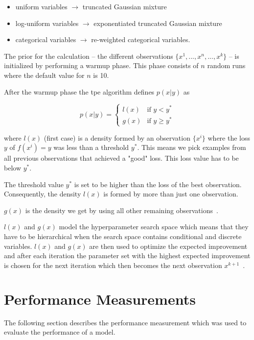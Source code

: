 \begin{itemize}
	\item uniform variables $\rightarrow$ truncated Gaussian mixture
	\item log-uniform variables $\rightarrow$ exponentiated truncated Gaussian mixture
	\item categorical variables $\rightarrow$ re-weighted categorical variables.
\end{itemize}

 The prior for the calculation -- the different observations $\{x^1,..., x^n, ..., x^k\}$ -- is initialized by performing a warmup phase. This phase consists of $n$ random runs where the default value for $n$ is 10.
\medskip

After the warmup phase the \gls{tpe} algorithm defines $p(x|y)$ as

\begin{equation}
p(x|y) =
\begin{cases}

l(x) & \text{if } y < y^* \\
g(x) & \text{if } y \geq y^*

\end{cases}
\end{equation}

where $l(x)$ {(first case)} is a density formed by an observation $\{x^i\}$ where the loss $y$ of $f(x^i)=y$ was less than a threshold $y^*$. This means we pick examples from all previous observations that achieved a "good" loss. This loss value has to be below $y^*$.
\medskip

The threshold value $y^*$ is set to be higher than the loss of the best observation. Consequently, the density $l(x)$ is formed by more than just one observation. 
\smallskip

$g(x)$ is the density we get by using all other remaining observations~\cite{Bergstra2013a}. 
\medskip



$l(x)$ and $g(x)$ model the hyperparameter search space which means that they have to be hierarchical when the search space contains conditional and discrete variables. $l(x)$ and $g(x)$ are then used to optimize the expected improvement and after each iteration the parameter set with the highest expected improvement is chosen for the next iteration which then becomes the next observation $x^{k+1}$~\cite{Bergstra2013a}. 

\section{Performance Measurements}
The following section describes the performance measurement which was used to evaluate the performance of a model.


